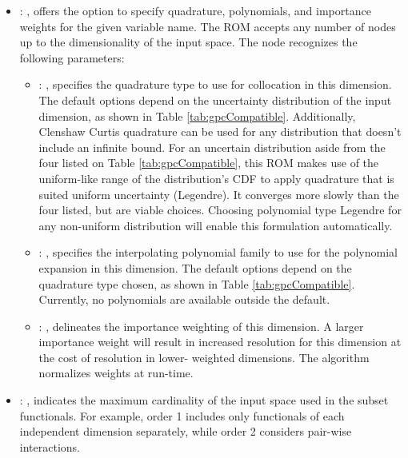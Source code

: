 \begin{itemize}
    \item {}: , 
      offers the option to specify quadrature, polynomials, and importance weights for the given
      variable name.  The ROM accepts any number of  nodes up to the
      dimensionality of the input space.
      The  node recognizes the following parameters:
        \begin{itemize}
          \item {}: , 
            specifies the quadrature type to use for collocation in this dimension.  The default
            options                   depend on the uncertainty distribution of the input dimension,
            as shown in Table                   \ref{tab:gpcCompatible}. Additionally, Clenshaw
            Curtis quadrature can be used for any                   distribution that doesn't
            include an infinite bound.                                      \nb For an uncertain distribution aside from
            the four listed on Table                   \ref{tab:gpcCompatible}, this ROM
            makes use of the uniform-like range of the distribution's CDF to apply quadrature that
            is                   suited uniform uncertainty (Legendre).  It converges more slowly
            than the four listed, but are                   viable choices.  Choosing polynomial
            type Legendre for any non-uniform distribution will                   enable this
            formulation automatically.
          \item {}: , 
            specifies the interpolating polynomial family to use for the polynomial expansion in
            this                   dimension.  The default options depend on the quadrature type
            chosen, as shown in Table                   \ref{tab:gpcCompatible}.  Currently, no
            polynomials are available outside the                   default. 
          \item {}: , 
            delineates the importance weighting of this dimension.  A larger importance weight will
            result in increased resolution for this dimension at the cost of resolution in lower-
            weighted                   dimensions.  The algorithm normalizes weights at run-time. 
      \end{itemize}

    \item {}: , 
      indicates the maximum cardinality of the input space used in the subset functionals.  For
      example, order 1                                                  includes only functionals of
      each independent dimension separately, while order 2 considers pair-wise interactions.
  \end{itemize}

